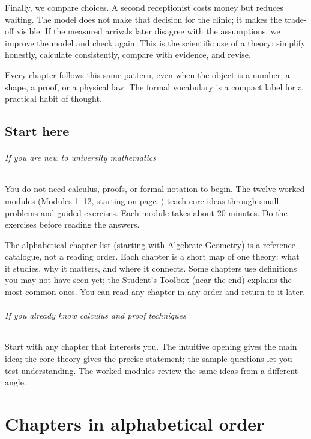 \documentclass[11pt,oneside]{book}
\begin{document}
Finally, we compare choices. A second receptionist costs money but reduces waiting. The model does not make that decision for the clinic; it makes the trade-off visible. If the measured arrivals later disagree with the assumptions, we improve the model and check again. This is the scientific use of a theory: simplify honestly, calculate consistently, compare with evidence, and revise.

Every chapter follows this same pattern, even when the object is a number, a shape, a proof, or a physical law. The formal vocabulary is a compact label for a practical habit of thought.

\tableofcontents

\chapter*{Start here}

\paragraph{If you are new to university mathematics}
You do not need calculus, proofs, or formal notation to begin. The twelve worked modules (Modules 1--12, starting on page~\pageref{module1}) teach core ideas through small problems and guided exercises. Each module takes about 20 minutes. Do the exercises before reading the answers.

The alphabetical chapter list (starting with Algebraic Geometry) is a reference catalogue, not a reading order. Each chapter is a short map of one theory: what it studies, why it matters, and where it connects. Some chapters use definitions you may not have seen yet; the Student's Toolbox (near the end) explains the most common ones. You can read any chapter in any order and return to it later.

\paragraph{If you already know calculus and proof techniques}
Start with any chapter that interests you. The intuitive opening gives the main idea; the core theory gives the precise statement; the sample questions let you test understanding. The worked modules review the same ideas from a different angle.

\mainmatter

\part{Chapters in alphabetical order}

\end{document}
